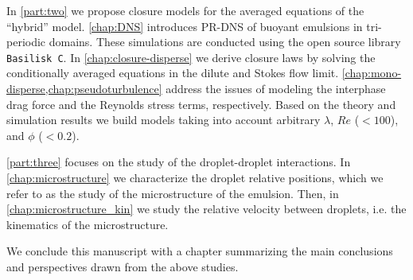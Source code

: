 In \ref{part:two} we propose closure models for the averaged equations of the ``hybrid'' model. 
\ref{chap:DNS} introduces PR-DNS of buoyant emulsions in tri-periodic domains. 
These simulations are conducted using the open source library \texttt{Basilisk C}.
In \ref{chap:closure-disperse} we derive closure laws by solving the conditionally averaged equations in the dilute and Stokes flow limit. 
\ref{chap:mono-disperse,chap:pseudoturbulence} address the issues of modeling the interphase drag force and the Reynolds stress terms, respectively. 
Based on the theory and simulation results we build models taking into account arbitrary $\lambda$, $Re$ ($< 100$), and $\phi$ ($< 0.2$). 



\ref{part:three} focuses on the study of the droplet-droplet interactions. 
In \ref{chap:microstructure} we characterize the droplet relative positions, which we refer to as the study of the microstructure of the emulsion. 
Then, in \ref{chap:microstructure_kin} we study the relative velocity between droplets, i.e. the kinematics of the microstructure. 


We conclude this manuscript with a chapter summarizing the main conclusions and perspectives drawn from the above studies. 